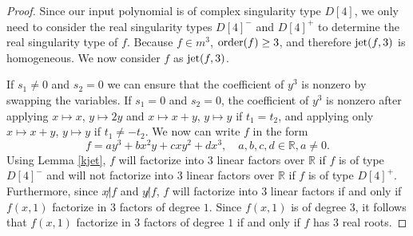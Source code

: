 \documentclass{amsproc}
\begin{document}
\begin{proof}
Since our input polynomial is of complex singularity type $D[4]$, we only need to consider the real singularity types $D[4]^-$ and $D[4]^+$ to determine the real singularity type of $f$. Because $f\in m^3$, $\textnormal{order}(f)\ge3$, and therefore $\textnormal{jet}(f,3)$ is homogeneous. We now consider $f$ as $\textnormal{jet}(f,3)$. 

If $s_1\neq 0$ and $s_2=0$ we can ensure that the coefficient of $y^3$ is nonzero by swapping the variables. If $s_1=0$ and $s_2=0$, the coefficient of $y^3$ is nonzero after applying $x\mapsto x$, $y\mapsto 2y$ and $x\mapsto x+y$, $y\mapsto y$ if $t_1=t_2$, and applying only $x\mapsto x+y$, $y\mapsto y$ if $t_1\neq -t_2$. We now can write $f$ in the form
\begin{equation*}
f=ay^3+bx^2y+cxy^2+dx^3,\quad a,b,c,d\in\mathbb R, a\neq 0.
\end{equation*}
Using Lemma \ref{kjet}, $f$ will factorize into $3$ linear factors over $\mathbb R$ if $f$ is of type $D[4]^-$ and will not factorize into $3$ linear factors over $\mathbb R$ if $f$ is of type $D[4]^+$. Furthermore, since $x\not | f$ and $y\not | f$, $f$ will factorize into $3$ linear factors if and only if $f(x,1)$ factorize in $3$  factors of degree $1$. Since $f(x,1)$ is of degree $3$, it follows that $f(x,1)$ factorize in $3$ factors of degree $1$ if and only if $f$ has $3$ real roots.


\end{proof}
\end{document}
